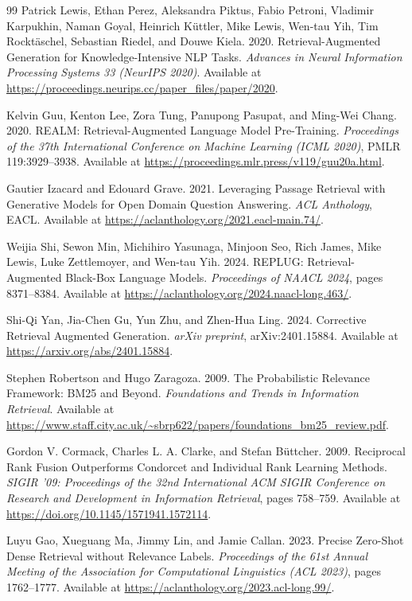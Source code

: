\documentclass[11pt,a4paper]{article}
\begin{document}
\begin{thebibliography}{99}
Patrick Lewis, Ethan Perez, Aleksandra Piktus, Fabio Petroni, Vladimir Karpukhin, Naman Goyal, Heinrich K\"uttler, Mike Lewis, Wen-tau Yih, Tim Rockt\"aschel, Sebastian Riedel, and Douwe Kiela. 2020. Retrieval-Augmented Generation for Knowledge-Intensive NLP Tasks. \emph{Advances in Neural Information Processing Systems 33 (NeurIPS 2020)}. Available at \url{https://proceedings.neurips.cc/paper_files/paper/2020}.

Kelvin Guu, Kenton Lee, Zora Tung, Panupong Pasupat, and Ming-Wei Chang. 2020. REALM: Retrieval-Augmented Language Model Pre-Training. \emph{Proceedings of the 37th International Conference on Machine Learning (ICML 2020)}, PMLR 119:3929--3938. Available at \url{https://proceedings.mlr.press/v119/guu20a.html}.

Gautier Izacard and Edouard Grave. 2021. Leveraging Passage Retrieval with Generative Models for Open Domain Question Answering. \emph{ACL Anthology}, EACL. Available at \url{https://aclanthology.org/2021.eacl-main.74/}.

Weijia Shi, Sewon Min, Michihiro Yasunaga, Minjoon Seo, Rich James, Mike Lewis, Luke Zettlemoyer, and Wen-tau Yih. 2024. REPLUG: Retrieval-Augmented Black-Box Language Models. \emph{Proceedings of NAACL 2024}, pages 8371--8384. Available at \url{https://aclanthology.org/2024.naacl-long.463/}.

Shi-Qi Yan, Jia-Chen Gu, Yun Zhu, and Zhen-Hua Ling. 2024. Corrective Retrieval Augmented Generation. \emph{arXiv preprint}, arXiv:2401.15884. Available at \url{https://arxiv.org/abs/2401.15884}.

Stephen Robertson and Hugo Zaragoza. 2009. The Probabilistic Relevance Framework: BM25 and Beyond. \emph{Foundations and Trends in Information Retrieval}. Available at \url{https://www.staff.city.ac.uk/~sbrp622/papers/foundations_bm25_review.pdf}.

Gordon V. Cormack, Charles L. A. Clarke, and Stefan B\"uttcher. 2009. Reciprocal Rank Fusion Outperforms Condorcet and Individual Rank Learning Methods. \emph{SIGIR '09: Proceedings of the 32nd International ACM SIGIR Conference on Research and Development in Information Retrieval}, pages 758--759. Available at \url{https://doi.org/10.1145/1571941.1572114}.

Luyu Gao, Xueguang Ma, Jimmy Lin, and Jamie Callan. 2023. Precise Zero-Shot Dense Retrieval without Relevance Labels. \emph{Proceedings of the 61st Annual Meeting of the Association for Computational Linguistics (ACL 2023)}, pages 1762--1777. Available at \url{https://aclanthology.org/2023.acl-long.99/}.

\end{thebibliography}
\end{document}
